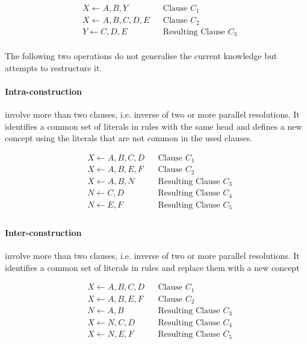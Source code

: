 \documentclass{article}
\theoremstyle{plain}
\theoremstyle{definition}
\begin{document}
\begin{multicols}{2}
\begin{align*}
& X \leftarrow A, B, Y && \text{Clause } C_1\\
& X \leftarrow A, B, C, D, E && \text{Clause } C_2\\
& Y \leftarrow C, D, E && \text{Resulting Clause } C_3
\end{align*}

\paragraph{} The following two operations do not generalise the current knowledge but attempts to restructure it.

\paragraph{Intra-construction} involve more than two clauses, i.e. inverse of two or more parallel resolutions. It identifies a common set of literals in rules with the same head and defines a new concept using the literals that are not common in the used clauses.

\begin{align*}
& X \leftarrow A, B, C, D && \text{Clause } C_1\\
& X \leftarrow A, B, E, F && \text{Clause } C_2\\
& X \leftarrow A, B, N && \text{Resulting Clause } C_3\\
& N \leftarrow C, D && \text{Resulting Clause } C_4\\
& N \leftarrow E, F && \text{Resulting Clause } C_5\\
\end{align*}

\paragraph{Inter-construction} involve more than two clauses, i.e. inverse of two or more parallel resolutions. It identifies a common set of literals in rules and replace them with a new concept

\begin{align*}
& X \leftarrow A, B, C, D && \text{Clause } C_1\\
& X \leftarrow A, B, E, F && \text{Clause } C_2\\
& N \leftarrow A, B && \text{Resulting Clause } C_3\\
& X \leftarrow N, C, D && \text{Resulting Clause } C_4\\
& X \leftarrow N, E, F && \text{Resulting Clause } C_5\\
\end{align*}


\end{multicols}
\end{document}
